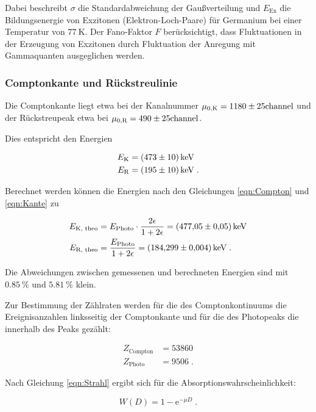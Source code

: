 Dabei beschreibt $\sigma$ die Standardabweichung der Gaußverteilung und $E_\text{Ex}$ die
Bildungsenergie von Exzitonen (Elektron-Loch-Paare) für Germanium bei einer Temperatur von $\SI{77}{\kelvin}$. 
Der Fano-Faktor $F$ berücksichtigt, dass Fluktuationen in der Erzeugung von Exzitonen
durch Fluktuation der Anregung mit Gammaquanten ausgeglichen werden.

\subsubsection{Comptonkante und Rückstreulinie}

Die Comptonkante liegt etwa bei der Kanalnummer $\mu_{0,\text{K}} = \num{1180 +- 25}\text{channel}$ und der Rückstreupeak etwa bei
$\mu_{0, \text{R}} = \num{490 +- 25}\text{channel}$.

Dies entspricht den Energien

\begin{align*}
  E_\text{K} &= \SI{473 +- 10}{\kilo\eV} \\
  E_\text{R} &= \SI{195 +- 10}{\kilo\eV} \; .
\end{align*}

Berechnet werden können die Energien nach den Gleichungen \eqref{eqn:Compton} und \eqref{eqn:Kante} zu

\begin{align*}
  E_\text{K, theo} &= E_\text{Photo} \cdot \frac{2 \epsilon}{1 + 2 \epsilon} = \SI{477.05 +- 0.05}{\kilo\eV} \\
  E_\text{R, theo} &= \frac{E_\text{Photo}}{1 + 2 \epsilon} =\SI{184.299 +- 0.004}{\kilo\eV} \; .
\end{align*}

Die Abweichungen zwischen gemessenen und berechneten Energien sind mit $\SI{0.85}{\percent}$ und $\SI{5.81}{\percent}$ klein. 

Zur Bestimmung der Zählraten werden für die des Comptonkontinuums die Ereignisanzahlen linksseitig der Comptonkante
und für die des Photopeaks die innerhalb des Peaks gezählt: 

\begin{align*}
  Z_\text{Compton} &= \num{53860} \\
  Z_\text{Photo} &= \num{9506} \; .
\end{align*}

Nach Gleichung \eqref{eqn:Strahl} ergibt sich für die Absorptionswahrscheinlichkeit:

\begin{equation}
  W(D) = 1 - \text{e}^{- \mu D} \; .
\end{equation}

